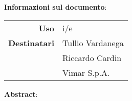 \begin{center}
\textbf{Informazioni sul documento}: \\
\vspace{0.5cm}

\begin{tabular}{r|l}
    \textbf{Uso} & i/e \\ 
    \textbf{Destinatari} & Tullio Vardanega \\ & Riccardo Cardin \\ & Vimar S.p.A.
\end{tabular}

\vfill

\textbf{Abstract}: \\
\vspace{0.5cm}

\end{center}


\bigskip